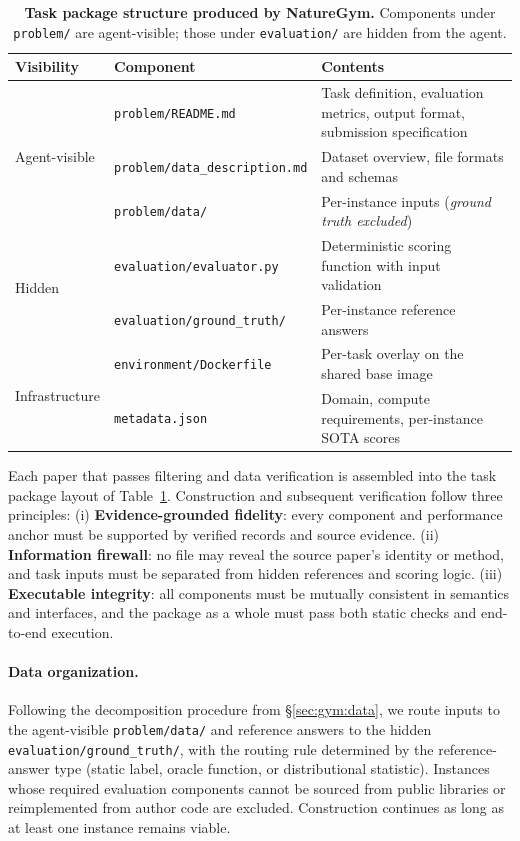 \begin{table}[t]
\centering
\caption{\textbf{Task package structure produced by NatureGym.} Components under \texttt{problem/} are agent-visible; those under \texttt{evaluation/} are hidden from the agent.}
\label{tab:taskpkg}
\small
\begin{tabularx}{\textwidth}{llX}
\toprule
\textbf{Visibility} & \textbf{Component} & \textbf{Contents} \\
\midrule
\multirow{3}{*}{Agent-visible}
  & \texttt{problem/README.md}             & Task definition, evaluation metrics, output format, submission specification \\
  & \texttt{problem/data\_description.md}  & Dataset overview, file formats and schemas \\
  & \texttt{problem/data/}                 & Per-instance inputs (\emph{ground truth excluded}) \\
\midrule
\multirow{2}{*}{Hidden}
  & \texttt{evaluation/evaluator.py}       & Deterministic scoring function with input validation \\
  & \texttt{evaluation/ground\_truth/}     & Per-instance reference answers \\
\midrule
\multirow{2}{*}{Infrastructure}
  & \texttt{environment/Dockerfile}        & Per-task overlay on the shared base image \\
  & \texttt{metadata.json}                 & Domain, compute requirements, per-instance SOTA scores \\
\bottomrule
\end{tabularx}
\end{table}

Each paper that passes filtering and data verification is assembled into the task package layout of Table~\ref{tab:taskpkg}.
Construction and subsequent verification follow three principles:
(i) \textbf{Evidence-grounded fidelity}: every component and performance anchor must be supported by verified records and source evidence.
(ii) \textbf{Information firewall}: no file may reveal the source paper's identity or method, and task inputs must be separated from hidden references and scoring logic.
(iii) \textbf{Executable integrity}: all components must be mutually consistent in semantics and interfaces, and the package as a whole must pass both static checks and end-to-end execution.


\paragraph{Data organization.}
Following the decomposition procedure from \S\ref{sec:gym:data}, we route inputs to the agent-visible \texttt{problem/data/} and reference answers to the hidden \texttt{evaluation/ground\_truth/}, with the routing rule determined by the reference-answer type (static label, oracle function, or distributional statistic).
Instances whose required evaluation components cannot be sourced from public libraries or reimplemented from author code are excluded. Construction continues as long as at least one instance remains viable.

